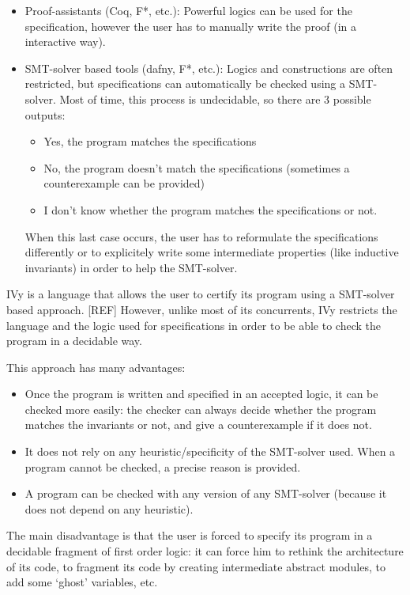 \documentclass[11pt,a4paper,oldfontcommands,openany]{memoir}
\begin{document}
    \begin{itemize}
        \item Proof-assistants (Coq, F*, etc.):
        Powerful logics can be used for the specification,
        however the user has to manually write the proof (in a interactive way).
        \item SMT-solver based tools (dafny, F*, etc.):
        Logics and constructions are often restricted, but specifications can automatically be checked using a SMT-solver.
        Most of time, this process is undecidable,
        so there are 3 possible outputs:
        \begin{itemize}
            \item Yes, the program matches the specifications
            \item No, the program doesn't match the specifications (sometimes a counterexample can be provided)
            \item I don't know whether the program matches the specifications or not.
        \end{itemize}
        When this last case occurs, the user has to reformulate the specifications differently or to explicitely write some intermediate properties (like inductive invariants)
        in order to help the SMT-solver.
    \end{itemize}

    IVy is a language that allows the user to certify its program using a SMT-solver based approach. [REF]
    However, unlike most of its concurrents, IVy restricts the language and the logic used for specifications
    in order to be able to check the program in a decidable way.

    This approach has many advantages:
    \begin{itemize}
        \item Once the program is written and specified in an accepted logic, it can be checked more easily:
        the checker can always decide whether the program matches the invariants or not, and give a counterexample if it does not.
        \item It does not rely on any heuristic/specificity of the SMT-solver used.
        When a program cannot be checked, a precise reason is provided.
        \item A program can be checked with any version of any SMT-solver (because it does not depend on any heuristic).
    \end{itemize}
    
    The main disadvantage is that the user is forced to specify its program in a decidable fragment of first order logic:
    it can force him to rethink the architecture of its code, to fragment its code by creating intermediate abstract modules,
    to add some `ghost' variables, etc.
\end{document}
